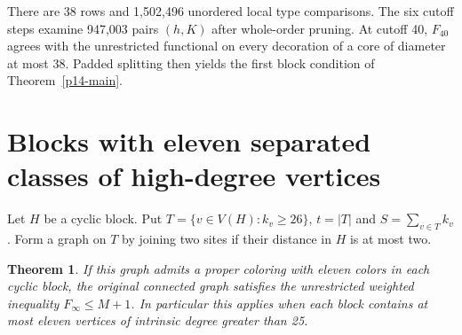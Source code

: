 \documentclass[11pt,a4paper]{article}
\newtheorem{theorem}{Theorem}[section]
\begin{document}
There are 38 rows and 1,502,496 unordered local type comparisons. The six cutoff steps examine 947,003 pairs $(h,K)$ after whole-order pruning. At cutoff 40, $F_{40}$ agrees with the unrestricted functional on every decoration of a core of diameter at most 38. Padded splitting then yields the first block condition of Theorem~\ref{p14-main}.

\section{Blocks with eleven separated classes of high-degree vertices}
Let $H$ be a cyclic block. Put $T=\{v\in V(H):k_v\ge26\}$, $t=|T|$ and $S=\sum_{v\in T}k_v$. Form a graph on $T$ by joining two sites if their distance in $H$ is at most two.
\begin{theorem}
If this graph admits a proper coloring with eleven colors in each cyclic block, the original connected graph satisfies the unrestricted weighted inequality $F_\infty\le M+1$. In particular this applies when each block contains at most eleven vertices of intrinsic degree greater than 25.
\end{theorem}
\end{document}
